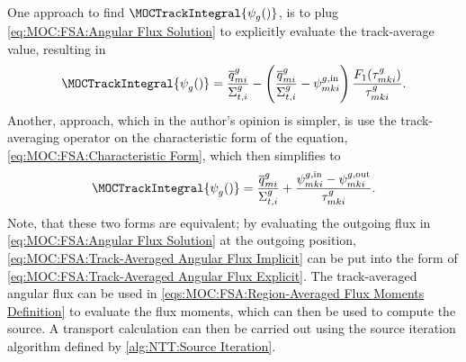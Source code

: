 {{{            One approach to find $\MOCTrackIntegral{\aflux[][g][]}$, is to plug \cref{eq:MOC:FSA:Angular Flux Solution} to explicitly evaluate the track-average value, resulting in
            \begin{equation}\label{eq:MOC:FSA:Track-Averaged Angular Flux Explicit}
                \MOCTrackIntegral{\aflux[][g][]} = \frac{\tsrcF[mi]}{\xst} - \left(\frac{\tsrcF[mi]}{\xst} - \afluxin\right)\frac{F_1(\segopt)}{\segopt}.
            \end{equation}
            Another, approach, which in the author's opinion is simpler, is use the track-averaging operator on the characteristic form of the equation, \cref{eq:MOC:FSA:Characteristic Form}, which then simplifies to
            \begin{equation}\label{eq:MOC:FSA:Track-Averaged Angular Flux Implicit}
                \MOCTrackIntegral{\aflux[][g][]} = \frac{\tsrcF[mi]}{\xst} + \frac{\afluxin-\afluxout}{\segopt}.
            \end{equation}
            Note, that these two forms are equivalent; by evaluating the outgoing flux in \cref{eq:MOC:FSA:Angular Flux Solution} at the outgoing position, \cref{eq:MOC:FSA:Track-Averaged Angular Flux Implicit} can be put into the form of \cref{eq:MOC:FSA:Track-Averaged Angular Flux Explicit}.
            The track-averaged angular flux can be used in \cref{eqs:MOC:FSA:Region-Averaged Flux Moments Definition} to evaluate the flux moments, which can then be used to compute the source.
            A transport calculation can then be carried out using the source iteration algorithm defined by \cref{alg:NTT:Source Iteration}.
        }
}}
